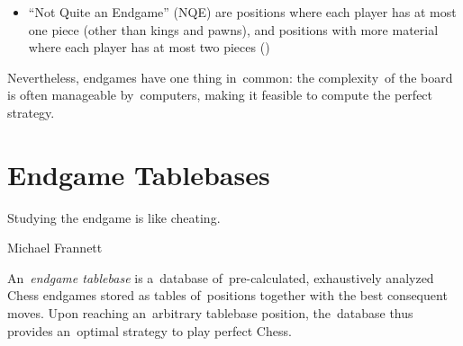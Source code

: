 \begin{itemize}
  \item
    ``Not Quite an Endgame'' (NQE) are positions where each player has at most one piece (other than kings and pawns), and positions with more material where each player has at most two pieces
    (\cite[pp.~7--8]{Flear2007practical})
\end{itemize}

Nevertheless, endgames have one thing in~common:
the complexity~of the board is often manageable by~computers, making it feasible to compute the perfect strategy.

\section{Endgame Tablebases}
\epigraph{
  Studying the endgame is like cheating.
}{Michael Frannett}
An~\emph{endgame tablebase} is a~database of~pre-calculated, exhaustively analyzed Chess endgames stored as tables of~positions together with the best consequent moves.
Upon reaching an~arbitrary tablebase position, the~database thus provides an~optimal strategy to play perfect Chess.

